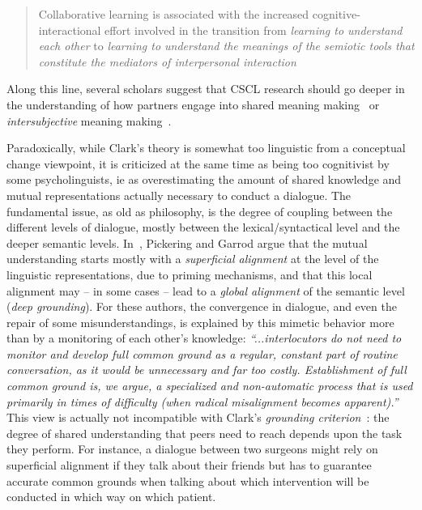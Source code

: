 \documentclass[11pt]{report}
\begin{document}
\begin{quote}
Collaborative learning is associated with the increased
cognitive-interactional effort involved in the transition from \emph{learning to
understand each other} to \emph{learning to understand the meanings of the semiotic
tools that constitute the mediators of interpersonal
interaction}~\cite{baker1999role}
\end{quote}

Along this line, several scholars suggest that CSCL research should go deeper in
the understanding of how partners engage into shared meaning
making~\cite{stahl2007meaning} or \emph{intersubjective} meaning
making~\cite{suthers2006technology}.

Paradoxically, while Clark's theory is somewhat too linguistic from a conceptual
change viewpoint, it is criticized at the same time as being too cognitivist by
some psycholinguists, ie as overestimating the amount of shared knowledge and
mutual representations actually necessary to conduct a dialogue. The fundamental
issue, as old as philosophy, is the degree of coupling between the different
levels of dialogue, mostly between the lexical/syntactical level and the deeper
semantic levels. In~\cite{pickering2006alignment}, Pickering and Garrod argue
that the mutual understanding starts mostly with a \emph{superficial alignment}
at the level of the linguistic representations, due to priming mechanisms, and
that this local alignment may -- in some cases -- lead to a \emph{global
alignment} of the semantic level (\emph{deep grounding}).  For these authors,
the convergence in dialogue, and even the repair of some misunderstandings, is
explained by this mimetic behavior more than by a monitoring of each other's
knowledge: \emph{``...interlocutors do not need to monitor and develop full
common ground as a regular, constant part of routine conversation, as it
would be unnecessary and far too costly. Establishment of full common ground
is, we argue, a specialized and non-automatic process that is used primarily
in times of difficulty (when radical misalignment becomes
apparent).''}~\cite{pickering2006alignment} This view is actually not
incompatible with Clark's \emph{grounding
criterion}~\cite{clark1989contributing}: the degree of shared understanding that
peers need to reach depends upon the task they perform. For instance, a dialogue
between two surgeons might rely on superficial alignment if they talk about
their friends but has to guarantee accurate common grounds when talking about
which intervention will be conducted in which way on which patient.
\end{document}
